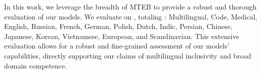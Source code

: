 In this work, we leverage the breadth of MTEB to provide a robust and thorough evaluation of our models. We evaluate on , totaling : Multilingual, Code, Medical, English, Russian, French, German, Polish, Dutch, Indic, Persian, Chinese, Japanese, Korean, Vietnamese, European, and Scandinavian. This extensive evaluation allows for a robust and fine-grained assessment of our models' capabilities, directly supporting our claims of multilingual inclusivity and broad domain competence.